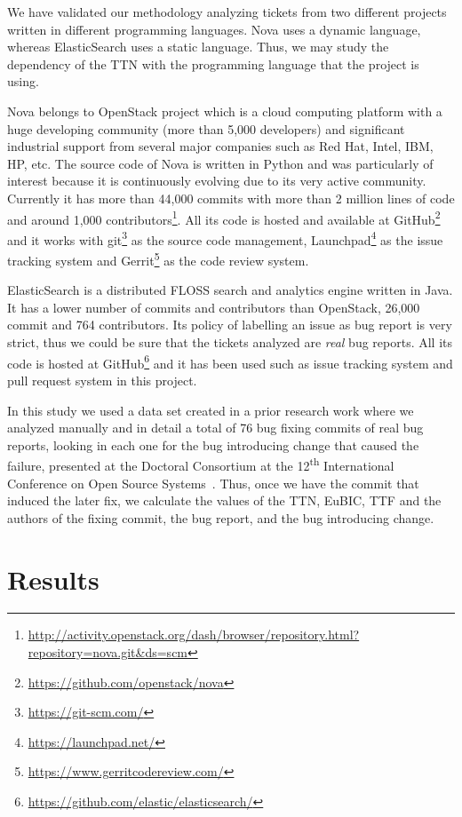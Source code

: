 \documentclass[10pt, conference]{IEEEtran}
\begin{document}
We have validated our methodology analyzing tickets from two different projects written in different programming languages. Nova uses a dynamic language, whereas ElasticSearch uses a static language. Thus, we may study the dependency of the TTN with the programming language that the project is using.

Nova belongs to OpenStack project which is a cloud computing platform with a huge developing community (more than 5,000 developers) and significant industrial support from several major companies such as Red Hat, Intel, IBM, HP, etc. The source code of Nova is written in Python and was particularly of interest because it is continuously evolving due to its very active community. Currently it has more than 44,000 commits with more than 2 million lines of code and around 1,000 contributors\footnote{\url{http://activity.openstack.org/dash/browser/repository.html?repository=nova.git&ds=scm}}. All its code is hosted and available at GitHub\footnote{\url{https://github.com/openstack/nova}} and it works with git\footnote{\url{https://git-scm.com/}} as the source code management, Launchpad\footnote{\url{https://launchpad.net/}} as the issue tracking system and Gerrit\footnote{\url{https://www.gerritcodereview.com/}} as the code review system.

ElasticSearch is a distributed FLOSS search and analytics engine written in Java. It has a lower number of commits and contributors than OpenStack, 26,000 commit and 764 contributors. Its policy of labelling an issue as bug report is very strict, thus we could be sure that the tickets analyzed are \emph{real} bug reports. All its code is hosted at GitHub\footnote{\url{https://github.com/elastic/elasticsearch/}} and it has been used such as issue tracking system and pull request system in this project.

In this study we used a data set created in a prior research work where we analyzed manually and in detail a total of 76 bug fixing commits of real bug reports, looking in each one for the bug introducing change that caused the failure, presented at the Doctoral Consortium at the 12\textsuperscript{th} International Conference on Open Source Systems~\cite{crowston2016proceedings}. Thus, once we have the commit that induced the later fix, we calculate the values of the TTN, EuBIC, TTF and the authors of the fixing commit, the bug report, and the bug introducing change.  


\section{Results}
\label{sec:results}
\end{document}
